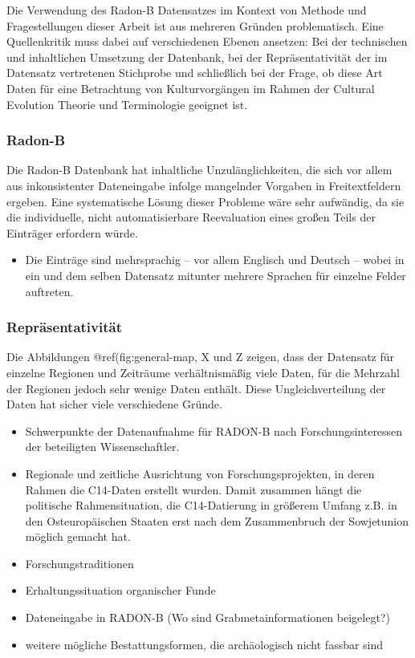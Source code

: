 \documentclass[openany,twoside,twocolumn]{book}
\providecommand{\tightlist}{%
  \setlength{\itemsep}{0pt}\setlength{\parskip}{0pt}}
\begin{document}
Die Verwendung des Radon-B Datensatzes im Kontext von Methode und
Fragestellungen dieser Arbeit ist aus mehreren Gründen problematisch.
Eine Quellenkritik muss dabei auf verschiedenen Ebenen ansetzen: Bei der
technischen und inhaltlichen Umsetzung der Datenbank, bei der
Repräsentativität der im Datensatz vertretenen Stichprobe und
schließlich bei der Frage, ob diese Art Daten für eine Betrachtung von
Kulturvorgängen im Rahmen der Cultural Evolution Theorie und
Terminologie geeignet ist.

\hypertarget{radon-b}{%
\subsubsection{Radon-B}\label{radon-b}}

Die Radon-B Datenbank hat inhaltliche Unzulänglichkeiten, die sich vor
allem aus inkonsistenter Dateneingabe infolge mangelnder Vorgaben in
Freitextfeldern ergeben. Eine systematische Lösung dieser Probleme wäre
sehr aufwändig, da sie die individuelle, nicht automatisierbare
Reevaluation eines großen Teils der Einträger erfordern würde.

\begin{itemize}
\tightlist
\item
  Die Einträge sind mehrsprachig -- vor allem Englisch und Deutsch --
  wobei in ein und dem selben Datensatz mitunter mehrere Sprachen für
  einzelne Felder auftreten.
\end{itemize}

\hypertarget{reprasentativitat}{%
\subsubsection{Repräsentativität}\label{reprasentativitat}}

Die Abbildungen @ref(fig:general-map, X und Z zeigen, dass der Datensatz
für einzelne Regionen und Zeiträume verhältnismäßig viele Daten, für die
Mehrzahl der Regionen jedoch sehr wenige Daten enthält. Diese
Ungleichverteilung der Daten hat sicher viele verschiedene Gründe.

\begin{itemize}
\tightlist
\item
  Schwerpunkte der Datenaufnahme für RADON-B nach Forschungsinteressen
  der beteiligten Wissenschaftler.
\item
  Regionale und zeitliche Ausrichtung von Forschungsprojekten, in deren
  Rahmen die C14-Daten erstellt wurden. Damit zusammen hängt die
  politische Rahmensituation, die C14-Datierung in größerem Umfang z.B.
  in den Osteuropäischen Staaten erst nach dem Zusammenbruch der
  Sowjetunion möglich gemacht hat.
\item
  Forschungstraditionen
\item
  Erhaltungssituation organischer Funde
\item
  Dateneingabe in RADON-B (Wo sind Grabmetainformationen beigelegt?)
\item
  weitere mögliche Bestattungsformen, die archäologisch nicht fassbar
  sind
\end{itemize}
\end{document}
